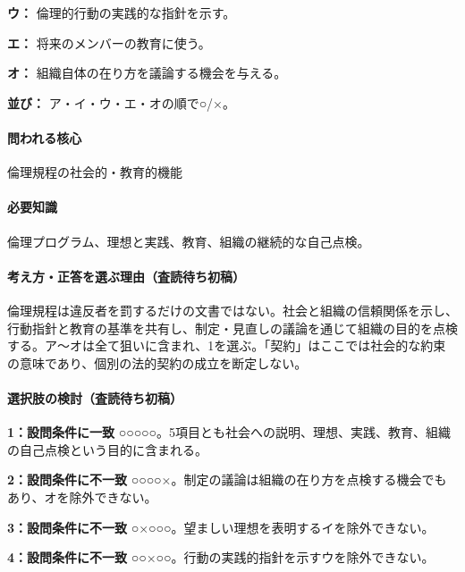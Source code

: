 \noindent\textbf{ウ：} 倫理的行動の実践的な指針を示す。\par

\noindent\textbf{エ：} 将来のメンバーの教育に使う。\par

\noindent\textbf{オ：} 組織自体の在り方を議論する機会を与える。\par

\noindent\textbf{並び：} ア・イ・ウ・エ・オの順で○/×。\par

\paragraph{問われる核心} 倫理規程の社会的・教育的機能

\paragraph{必要知識} 倫理プログラム、理想と実践、教育、組織の継続的な自己点検。

\paragraph{考え方・正答を選ぶ理由（査読待ち初稿）} 倫理規程は違反者を罰するだけの文書ではない。社会と組織の信頼関係を示し、行動指針と教育の基準を共有し、制定・見直しの議論を通じて組織の目的を点検する。ア〜オは全て狙いに含まれ、1を選ぶ。「契約」はここでは社会的な約束の意味であり、個別の法的契約の成立を断定しない。

\paragraph{選択肢の検討（査読待ち初稿）}\mbox{}\par

\noindent\textbf{1：設問条件に一致} ○○○○○。5項目とも社会への説明、理想、実践、教育、組織の自己点検という目的に含まれる。\par

\noindent\textbf{2：設問条件に不一致} ○○○○×。制定の議論は組織の在り方を点検する機会でもあり、オを除外できない。\par

\noindent\textbf{3：設問条件に不一致} ○×○○○。望ましい理想を表明するイを除外できない。\par

\noindent\textbf{4：設問条件に不一致} ○○×○○。行動の実践的指針を示すウを除外できない。\par

